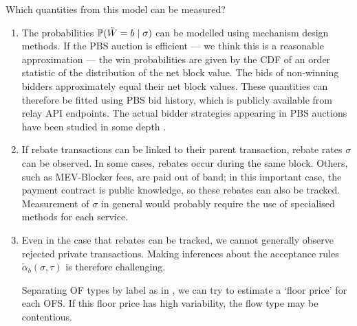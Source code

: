 Which quantities from this model can be measured?
%
\begin{enumerate}
  \item
    The probabilities $\mathbb{P}(\tilde{W}=b\mid \sigma)$ can be modelled using mechanism design methods. 
    If the PBS auction is efficient --- we think this is a reasonable approximation --- the win probabilities are given by the CDF of an order statistic of the distribution of the net block value. 
    The bids of non-winning bidders approximately equal their net block values.
    These quantities can therefore be fitted using PBS bid history, which is publicly available from relay API endpoints.
    The actual bidder strategies appearing in PBS auctions have been studied in some depth \cite{thierythomas2023empirical}.

  \item
    If rebate transactions can be linked to their parent transaction, rebate rates $\sigma$ can be observed.
    In some cases, rebates occur during the same block.
    Others, such as MEV-Blocker fees, are paid out of band; in this important case, the payment contract is public knowledge, so these rebates can also be tracked.
    Measurement of $\sigma$ in general would probably require the use of specialised methods for each service.

  \item
    Even in the case that rebates can be tracked, we cannot generally observe rejected private transactions.
    Making inferences about the acceptance rules $\tilde\alpha_b(\sigma,\tau)$ is therefore challenging.
    
    Separating OF types by label as in \cite{oz2024whoa}, we can try to estimate a `floor price' for each OFS.
    If this floor price has high variability, the flow type may be contentious.


\end{enumerate}

